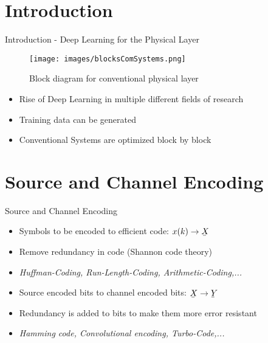 \documentclass[xcolor=table,mathserif,9pt]{beamer}    %
\newcommand{\ubar}[1]{\underaccent{\bar}{#1}}
\begin{document}
\section{Introduction}%
\label{sec:introduction}
\begin{frame}{Introduction - Deep Learning for the Physical Layer}

\begin{figure}[htpb]
	\centering
	\texttt{[image: images/blocksComSystems.png]}
	\caption{Block diagram for conventional physical layer}
\end{figure}

\begin{itemize}
	\item Rise of Deep Learning in multiple different fields of research
	\item Training data can be generated 
	\item Conventional Systems are optimized block by block
\end{itemize}


\end{frame}

\section{Source and Channel Encoding}%
\begin{frame}{Source and Channel Encoding}

\vspace{1em}
\begin{itemize}
	\item Symbols to be encoded to efficient code: $x(k) \to \ubar{X}$
	\item Remove redundancy in code (Shannon code theory)
	\item \emph{Huffman-Coding, Run-Length-Coding, Arithmetic-Coding,...}
\end{itemize}

\vspace{2em}

\vspace{1em}
\begin{itemize}
	\item Source encoded bits to channel encoded bits: $\ubar{X} \to \ubar{Y}$
	\item Redundancy is added to bits to make them more error resistant
	\item \emph{Hamming code, Convolutional encoding, Turbo-Code,...}
\end{itemize}

\end{frame}
\end{document}
